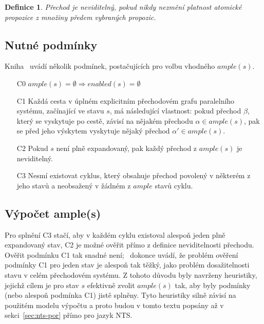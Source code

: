 \documentclass[12pt]{fithesis2}
\newtheorem{definition}{Definice}
\begin{document}
\begin{definition}
Přechod je neviditelný, pokud nikdy nezmění platnost atomické propozice z množiny předem vybraných propozic.
\end{definition}

\subsection{Nutné podmínky}
\label{subsec:por:ample-conditions}
Kniha~\cite{CLARKE} uvádí několik podmínek, postačujících pro volbu vhodného $\mathit{ample}(s)$.

\begin{enumerate}
\item[C0] $\mathit{ample}(s) = \emptyset \Rightarrow \mathit{enabled}(s) = \emptyset$
\item[C1] Každá cesta v úplném explicitním přechodovém grafu paralelního systému, začínající ve stavu $s$, má následující vlastnost: pokud přechod $\beta$, který se vyskytuje po cestě, závisí na nějakém přechodu $\alpha \in \mathit{ample}(s)$, pak se před jeho výskytem vyskytuje nějaký přechod $\alpha' \in \mathit{ample}(s)$.
\item[C2] Pokud $s$ není plně expandovaný, pak každý přechod z $\mathit{ample}(s)$ je neviditelný.
\item[C3] Nesmí existovat cyklus, který obsahuje přechod povolený v některém z jeho stavů a neobsažený v žádném z $\mathit{ample}$ stavů cyklu.
\end{enumerate}

\subsection{Výpočet ample(s)}
\label{subsec:por-compute-ample}
Pro splnění C3 stačí, aby v každém cyklu existoval alespoň jeden plně expandovaný stav, C2 je možné ověřit přímo z definice neviditelnosti přechodu. Ověřit podmínku C1 tak snadné není; \cite{CLARKE}~dokonce uvádí, že problém ověření podmínky C1 pro jeden stav je alespoň tak těžký, jako problém dosažitelnosti stavu v celém přechodovém systému. Z tohoto důvodu byly navrženy heuristiky, jejichž cílem je pro stav $s$ efektivně zvolit $ample(s)$ tak, aby byly podmínky (nebo alespoň podmínka C1) jistě splněny. Tyto heuristiky silně závisí na použitém modelu výpočtu a proto budou v tomto textu popsány až v sekci~\ref{sec:nts-por} přímo pro jazyk NTS.

\end{document}
